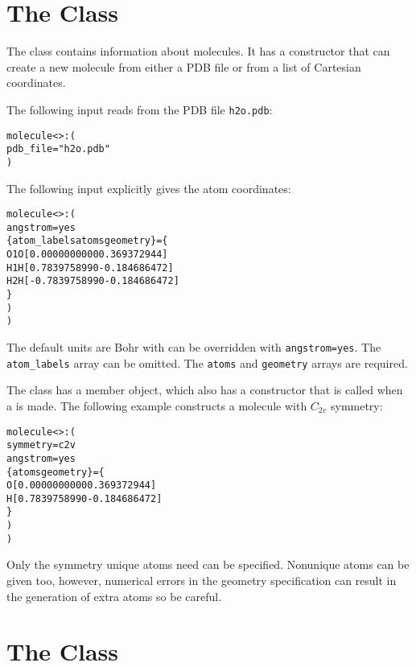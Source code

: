 

\section{The  Class}\label{Molecule}

The  class contains information about molecules.  It has a
 constructor that can create a new molecule from either a
PDB file or from a list of Cartesian coordinates.

The following  input reads from the PDB
file \verb|h2o.pdb|:
\begin{alltt}
molecule<>: (
   pdb_file = "h2o.pdb"
 )
\end{alltt}

The following input explicitly gives the atom coordinates:
\begin{alltt}
molecule<>: (
    angstrom=yes
    \{ atom_labels atoms           geometry            \} = \{
          O1         O   [ 0.000000000 0  0.369372944 ]
          H1         H   [ 0.783975899 0 -0.184686472 ]
          H2         H   [-0.783975899 0 -0.184686472 ]
     \}
    )
  )
\end{alltt}
The default units are Bohr with can be overridden with
\verb|angstrom=yes|.  The \verb|atom_labels| array can be
omitted.  The \verb|atoms| and \verb|geometry| arrays
are required.

The  class has a 
member object, which also has a  constructor
that is called when a  is made.  The
following example constructs a molecule with $C_{2v}$ symmetry:
\begin{alltt}
molecule<>: (
    symmetry=c2v
    angstrom=yes
    \{ atoms         geometry            \} = \{
        O   [0.000000000 0  0.369372944 ]
        H   [0.783975899 0 -0.184686472 ]
     \}
    )
  )
\end{alltt}
Only the symmetry unique atoms need can be specified.  Nonunique
atoms can be given too, however, numerical errors in the
geometry specification can result in the generation of extra
atoms so be careful.


\section{The  Class}\label{MolecularEnergy}

